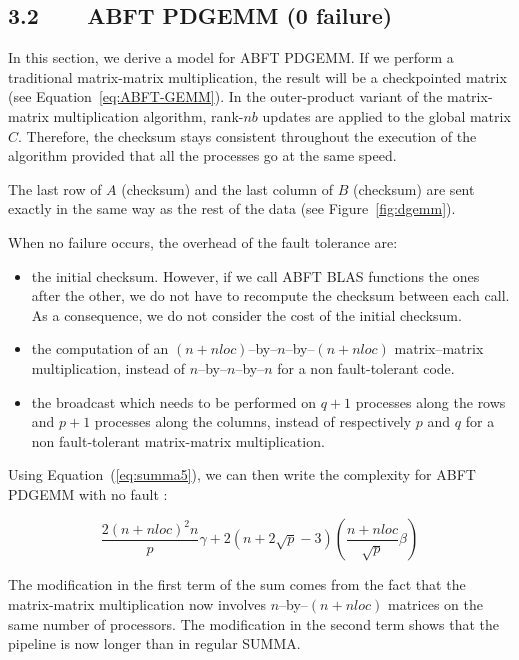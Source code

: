 \documentclass[pdftex,11pt]{article}
\begin{document}
\subsection*{\color{DodgerBlue4}3.2~~~~ABFT PDGEMM (0 failure)}

In this section, we derive a model for ABFT PDGEMM.  If we perform a
traditional matrix-matrix multiplication, the result will be a
checkpointed matrix (see Equation~\ref{eq:ABFT-GEMM}). In the
outer-product variant of the matrix-matrix multiplication algorithm,
rank-$nb$ updates are applied to the global matrix $C$. Therefore, the
checksum stays consistent throughout the execution of the algorithm
provided that all the processes go at the same speed.

The last row of $A$ (checksum) and the last column of $B$ (checksum)
are sent exactly in the same way as the rest of the data (see
Figure~\ref{fig:dgemm}).

When no failure occurs, the overhead of the fault tolerance are:
\begin{itemize}

\item the initial checksum. However, if we call ABFT BLAS functions
  the ones after the other, we do not have to recompute the checksum
  between each call. As a consequence, we do not consider the cost of
  the initial checksum.

\item the computation of an $(n+nloc)$--by--$n$--by--$(n+nloc)$
  matrix--matrix multiplication, instead of $n$--by--$n$--by--$n$ for
  a non fault-tolerant code.

\item the broadcast which needs to be performed on $q+1$ processes
  along the rows and $p+1$ processes along the columns, instead of
  respectively $p$ and $q$ for a non fault-tolerant matrix-matrix
  multiplication.

\end{itemize}

Using Equation~(\ref{eq:summa5}), we can then write the complexity for
ABFT PDGEMM with no fault :

\begin{equation}
\frac{2(n+nloc)^{2}n}{p}\gamma+2(n+2\sqrt{p}-3)(\frac{n+nloc}{\sqrt{p}}\beta)
\label{eq:effsumma}
\end{equation}

The modification in the first term of the sum comes from the fact that
the matrix-matrix multiplication now involves $n$--by--$(n+nloc)$
matrices on the same number of processors. The modification in the
second term shows that the pipeline is now longer than in regular
SUMMA.
\end{document}
